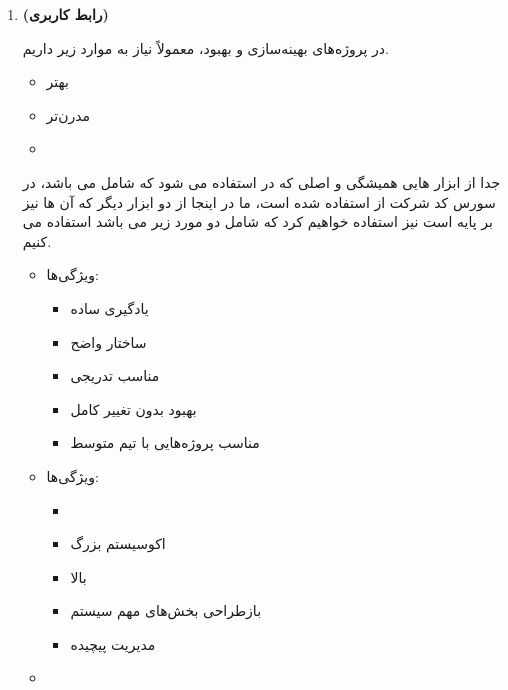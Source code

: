 \documentclass[12pt,a4paper]{report}
\begin{document}
\begin{enumerate}
\begin{itemize}
ویژگی‌ها:
\begin{itemize}
	\item 
بسیار پایدار
\item 
مناسب سیستم‌های 
\item
ابزارهای پیشرفته  و 
\item 
{} بالا در حجم داده زیاد
\item 
نگهداری سیستم‌های حیاتی
\item 
عدم نیاز به مهاجرت پرریسک
\item 
بهینه‌سازی  و ها
\end{itemize}
\end{itemize}
\item 
\textbf{ (رابط کاربری)}

در پروژه‌های بهینه‌سازی و بهبود،  معمولاً نیاز به موارد زیر داریم.
\begin{itemize}
	\item 
	 بهتر
	\item 
	 مدرن‌تر
	\item 
\end{itemize}

جدا از ابزار هایی همیشگی و اصلی که در  استفاده می شود که شامل  می باشد، در سورس کد شرکت از استفاده شده است، ما در اینجا از دو ابزار دیگر که آن ها نیز بر پایه   است نیز استفاده خواهیم کرد که شامل دو مورد زیر می باشد
استفاده می کنیم.
\begin{itemize}
	\item 


ویژگی‌ها:
\begin{itemize}
	\item 
یادگیری ساده
\item 
ساختار واضح
\item
مناسب  تدریجی
\item 
بهبود  بدون تغییر کامل 
\item
مناسب پروژه‌هایی با تیم متوسط
\end{itemize}
\item 
{}

ویژگی‌ها:
\begin{itemize}
	\item 

\item 
اکوسیستم بزرگ
\item 
{} بالا
\item 
بازطراحی بخش‌های مهم سیستم
\item 
مدیریت  پیچیده
\end{itemize}
\item
{}


\end{itemize}
\end{enumerate}
\end{document}
